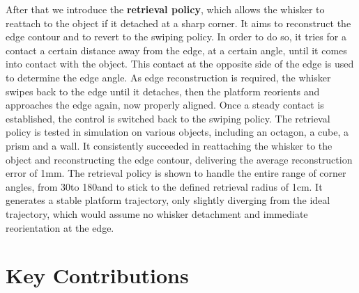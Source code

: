 After that we introduce the \textbf{retrieval policy}, which allows the whisker to reattach to the object if it detached at a sharp corner.
It aims to reconstruct the edge contour and to revert to the swiping policy.
In order to do so, it tries for a contact a certain distance away from the edge, at a certain angle, until it comes into contact with the object.
This contact at the opposite side of the edge is used to determine the edge angle.
As edge reconstruction is required, the whisker swipes back to the edge until it detaches, then the platform reorients and approaches the edge again, now properly aligned.
Once a steady contact is established, the control is switched back to the swiping policy.
The retrieval policy is tested in simulation on various objects, including an octagon, a cube, a prism and a wall.
It consistently succeeded in reattaching the whisker to the object and reconstructing the edge contour, delivering the average reconstruction error of 1mm.
The retrieval policy is shown to handle the entire range of corner angles, from 30\degree to 180\degree and to stick to the defined retrieval radius of 1cm.
It generates a stable platform trajectory, only slightly diverging from the ideal trajectory, which would assume no whisker detachment and immediate reorientation at the edge.

\section{Key Contributions}

